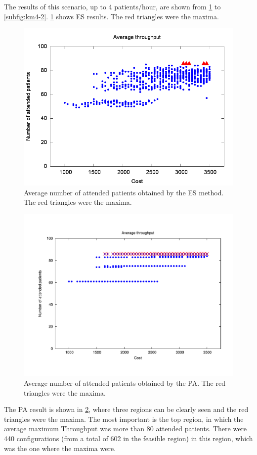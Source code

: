 \documentclass[11pt]{article} %
\begin{document}
The results of this scenario, up to 4 patients/hour, are shown from
\ref{subfig:es4-2} to \ref{subfig:km4-2}. \ref{subfig:es4-2} shows
ES results. The red triangles were the maxima.
\begin{figure}[H]
\centering{}\vspace*{-0.2cm}\includegraphics[width=0.9\columnwidth,height=0.19\paperheight]{figs4/v02/6400-602-25-exh-throughput-max}
\caption{Average number of attended patients obtained by the ES method. The
red triangles were the maxima. \label{subfig:es4-2}}
\end{figure}
 \vspace*{-0.2cm}

\begin{figure}[H]
\centering{}\vspace*{-0.2cm}\includegraphics[width=0.9\columnwidth,height=0.19\paperheight]{figs4/v02/6400-602-25-pipe-Throughput-max}
\caption{Average number of attended patients obtained by the PA. The red triangles
were the maxima. \label{subfig:pipe4-2}}
\end{figure}
 The PA result is shown in \ref{subfig:pipe4-2}, where three regions
can be clearly seen and the red triangles were the maxima. The most
important is the top region, in which the average maximum Throughput
was more than 80 attended patients. There were 440 configurations
(from a total of 602 in the feasible region) in this region, which
was the one where the maxima were.
\end{document}
